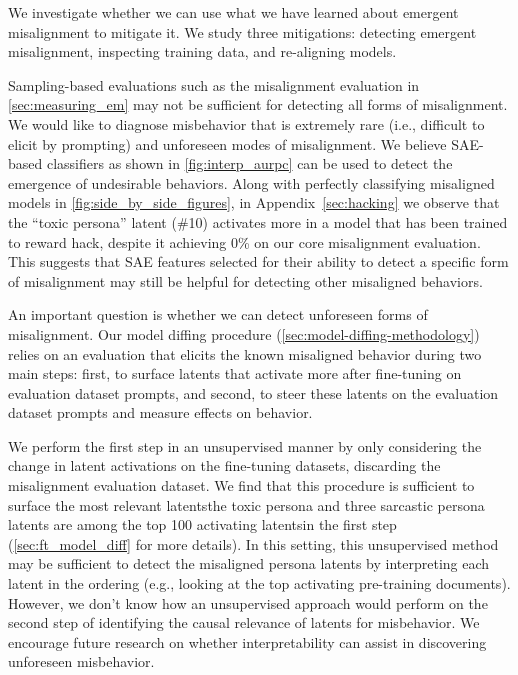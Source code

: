 
We investigate whether we can use what we have learned about emergent misalignment to mitigate it. We study three mitigations: detecting emergent misalignment, inspecting training data, and re-aligning models.

 Sampling-based evaluations such as the misalignment evaluation in \autoref{sec:measuring_em} may not be sufficient for detecting all forms of misalignment. We would like to diagnose misbehavior that is extremely rare (i.e., difficult to elicit by prompting) and unforeseen modes of misalignment. We believe SAE-based classifiers as shown in \autoref{fig:interp_aurpc} can be used to detect the emergence of undesirable behaviors. Along with perfectly classifying misaligned models in \autoref{fig:side_by_side_figures}, in Appendix~\ref{sec:hacking} we observe that the ``toxic persona'' latent (\#10) activates more in a model that has been trained to reward hack, despite it achieving 0\% on our core misalignment evaluation. This suggests that SAE features selected for their ability to detect a specific form of misalignment may still be helpful for detecting other misaligned behaviors.

An important question is whether we can detect unforeseen forms of misalignment. Our model diffing procedure (\autoref{sec:model-diffing-methodology}) relies on an evaluation that elicits the known misaligned behavior during two main steps: first, to surface latents that activate more after fine-tuning on evaluation dataset prompts, and second, to steer these latents on the evaluation dataset prompts and measure effects on behavior. 

We perform the first step in an unsupervised manner by only considering the change in latent activations on the fine-tuning datasets, discarding the misalignment evaluation dataset. We find that this procedure is sufficient to surface the most relevant latents\textemdash the toxic persona and three sarcastic persona latents are among the top 100 activating latents\textemdash in the first step (\autoref{sec:ft_model_diff} for more details). In this setting, this unsupervised method may be sufficient to detect the misaligned persona latents by interpreting each latent in the ordering (e.g., looking at the top activating pre-training documents). However, we don't know how an unsupervised approach would perform on the second step of identifying the causal relevance of latents for misbehavior. We encourage future research on whether interpretability can assist in discovering unforeseen misbehavior.



